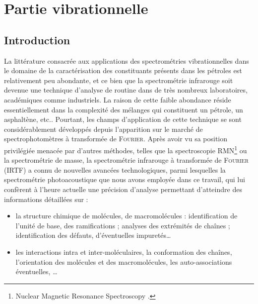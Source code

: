 \documentclass[12pt,a4paper]{book}
\begin{document}
	
	
\chapter{Partie vibrationnelle}
\minitoc
\restoregeometry

\newpage



\section*{Introduction}

La littérature consacrée aux applications des spectrométries vibrationnelles dans le domaine de la caractérisation des constituants présents dans les pétroles est relativement peu abondante, et ce bien que la spectrométrie infrarouge soit devenue une technique d'analyse de \og routine \fg{} dans de très nombreux laboratoires, académiques comme industriels. La raison de cette faible abondance réside essentiellement dans la complexité des mélanges qui constituent un pétrole, un asphaltène, etc.. Pourtant, les champs d'application de cette technique se sont considérablement développés depuis l'apparition sur le marché de spectrophotomètres à transformée de \textsc{Fourier}.
Après avoir vu sa position privilégiée menacée par d'autres méthodes, telles que la spectroscopie RMN\footnote{\og Nuclear Magnetic Resonance Spectroscopy \fg{}.} ou la spectrométrie de masse, la spectrométrie infrarouge à transformée de \textsc{Fourier} (IRTF) a connu de nouvelles avancées technologiques, parmi lesquelles la spectrométrie photoacoustique que nous avons employée dans ce travail, qui lui confèrent à l'heure actuelle une précision d'analyse permettant d'atteindre des informations détaillées sur :

\begin{itemize}
	\item la structure chimique de molécules, de macromolécules : identification de l'unité de base, des ramifications ; analyses des extrémités de chaînes ; identification des défauts, d'éventuelles impuretés\dots{}
	\item les interactions intra et inter-moléculaires, la conformation des chaînes, l'orientation des molécules et des macromolécules, les auto-associations éventuelles, \dots{}
\end{itemize}
\end{document}
